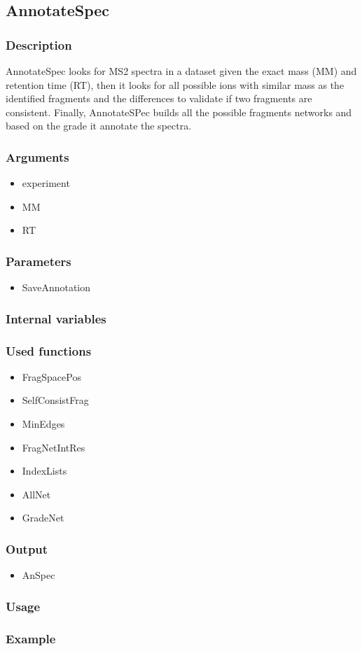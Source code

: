 \subsection{AnnotateSpec}\label{AnnotateSpec}
\subsubsection{Description}
AnnotateSpec looks for MS2 spectra in a dataset given the exact mass (MM) and retention time (RT), then it looks for all possible ions with similar mass as the identified fragments and the differences to validate if two fragments are consistent. Finally, AnnotateSPec builds all the possible fragments networks and based on the grade it annotate the spectra.
\subsubsection{Arguments}
\begin{itemize}
\item experiment
\item MM
\item RT
\end{itemize}
\subsubsection{Parameters}
\begin{itemize}
\item SaveAnnotation
\end{itemize}
\subsubsection{Internal variables}
\subsubsection{Used functions}
\begin{itemize}
\item FragSpacePos
\item SelfConsistFrag
\item MinEdges
\item FragNetIntRes
\item IndexLists
\item AllNet
\item GradeNet
\end{itemize}
\subsubsection{Output}
\begin{itemize}
\item AnSpec
\end{itemize}
\subsubsection{Usage}
\subsubsection{Example}
